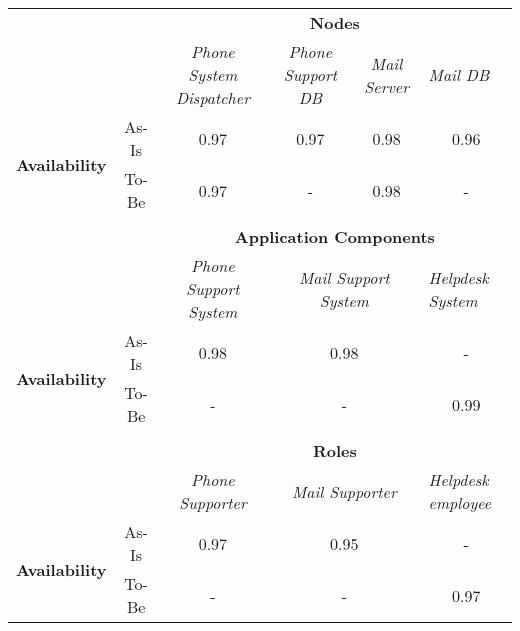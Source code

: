 \begin{table}[H]
	\centering
	\begin{tabular}{|c|c|p{2cm}|p{2.5cm}|p{2.5cm}|p{2.5cm}|}
		\cline{3-6}

		\multicolumn{2}{c}{} & \multicolumn{4}{|c|}{\textbf{Nodes}} \\ \cline{3-6}
		\multicolumn{2}{c|}{} & \multicolumn{1}{c|}{\textsl{Phone System Dispatcher}} & \multicolumn{1}{c|}{\textsl{Phone Support DB}} & \multicolumn{1}{c|}{\textsl{Mail Server}} & \multicolumn{1}{p{2cm}|}{\textsl{Mail DB}}\\
		\hline
		\multirow{2}{*}{\textbf{Availability}} & As-Is & \multicolumn{1}{c|}{0.97} & \multicolumn{1}{c|}{0.97} & \multicolumn{1}{c|}{0.98} &  \multicolumn{1}{c|}{0.96}\\ \cline{2-6}
										& To-Be &\multicolumn{1}{c|}{0.97} & \multicolumn{1}{c|}{-}& \multicolumn{1}{c|}{0.98} & \multicolumn{1}{c|}{-}\\ \hline

		\multicolumn{6}{c}{} \\ \cline{3-6}							
		\multicolumn{2}{c}{} & \multicolumn{4}{|c|}{\textbf{Application Components}} \\ \cline{3-6}
		\multicolumn{2}{c|}{} & \multicolumn{1}{c|}{\textsl{Phone Support System}} & \multicolumn{2}{c|}{\textsl{Mail Support System}} & \multicolumn{1}{p{2cm}|}{\textsl{Helpdesk System}}\\
		\hline
		\multirow{2}{*}{\textbf{Availability}} & As-Is & \multicolumn{1}{c|}{0.98} & \multicolumn{2}{c|}{0.98} & \multicolumn{1}{c|}{-}\\ \cline{2-6}
										& To-Be &\multicolumn{1}{c|}{-} & \multicolumn{2}{c|}{-} & \multicolumn{1}{c|}{0.99}\\ \hline

	   \multicolumn{6}{c}{} \\ \cline{3-6}
		\multicolumn{2}{c}{} & \multicolumn{4}{|c|}{\textbf{Roles}} \\ \cline{3-6}
		\multicolumn{2}{c|}{} & \multicolumn{1}{|c|}{\textsl{Phone Supporter}} & \multicolumn{2}{|c|}{\textsl{Mail Supporter}}& \multicolumn{1}{|p{2cm}|}{\textsl{Helpdesk employee}}\\ \hline
		\multirow{2}{*}{\textbf{Availability}} & As-Is & \multicolumn{1}{|c|}{0.97}& \multicolumn{2}{|c|}{0.95}& \multicolumn{1}{|c|}{-}\\ \cline{2-6}
		& To-Be & \multicolumn{1}{|c|}{-}  & \multicolumn{2}{|c|}{-} & \multicolumn{1}{|c|}{0.97}\\ \hline


\end{tabular}
\end{table}
